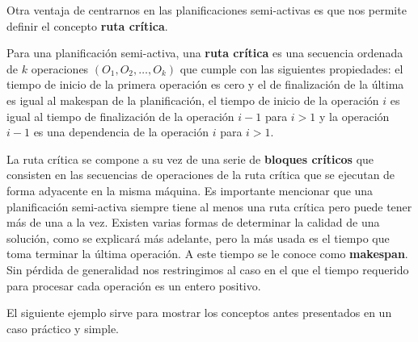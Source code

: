 %
Otra ventaja de centrarnos en las planificaciones semi-activas es que nos permite definir el concepto \textbf{ruta crítica}. 

%
Para una planificación semi-activa, una \textbf{ruta crítica} es una secuencia ordenada de $k$ operaciones $(O_1,O_2,\dots,O_k)$ que cumple con las siguientes propiedades: el tiempo de inicio de la primera operación es cero y el de finalización de la última es igual al makespan de la planificación, el tiempo de inicio de la operación $i$ es igual al tiempo de finalización de la operación $i-1$ para $i>1$ y la operación $i-1$ es una dependencia de la operación $i$ para $i>1$.  

%
La ruta crítica se compone a su vez de una serie de \textbf{bloques críticos} que consisten en las secuencias de operaciones de la ruta crítica que se ejecutan de forma 
adyacente en la misma máquina. 
%
Es importante mencionar que una planificación semi-activa siempre tiene al menos una ruta crítica pero puede tener más de una a la vez.
%
Existen varias formas de determinar la calidad de una solución, como se explicará más adelante, pero la más usada es el tiempo que toma terminar la última operación.
%
A este tiempo se le conoce como \textbf{makespan}. 
%
Sin pérdida de generalidad nos restringimos al caso en el que el tiempo requerido para procesar cada operación es un entero positivo.


%
El siguiente ejemplo sirve para mostrar los conceptos antes presentados en un caso práctico y simple.

